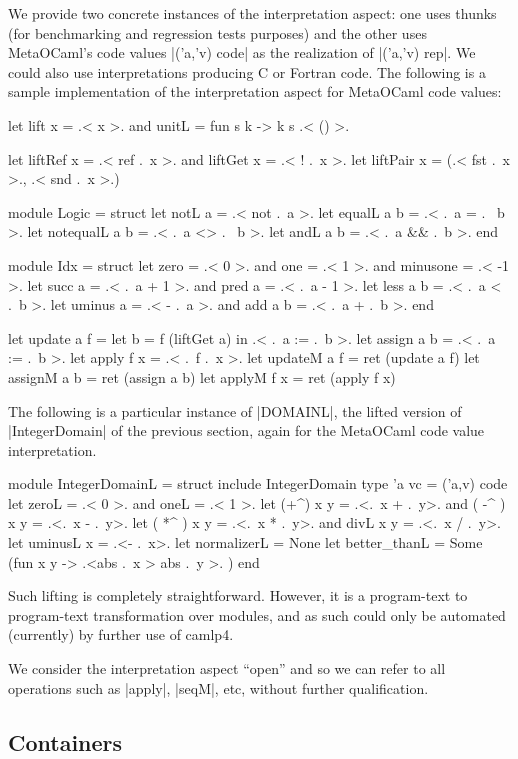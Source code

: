\documentclass{elsart}
\begin{document}
We provide two concrete instances of the interpretation aspect: one
uses thunks (for benchmarking and regression tests purposes) and the
other uses MetaOCaml's code values |('a,'v) code| as the realization
of |('a,'v) rep|. We could also use interpretations producing C or 
Fortran code. The following is a sample implementation of the
interpretation aspect for MetaOCaml code values:
\begin{code}
let lift x = .< x >.   and  unitL = fun s k -> k s .< () >.

let liftRef x = .< ref .~x >.  and   liftGet x = .< ! .~x >. 
let liftPair x = (.< fst .~x >., .< snd .~x >.)

module Logic = struct
  let notL a        = .< not .~a >.
  let equalL a b    = .< .~a = .~ b >.
  let notequalL a b = .< .~a <> .~ b >.
  let andL a b      = .< .~a && .~b >. 
end

module Idx = struct
  let zero = .< 0 >. and one = .< 1 >. and minusone = .< -1 >.
  let succ a = .< .~a + 1 >.  and  pred a = .< .~a - 1 >.
  let less a b = .< .~a < .~b >.
  let uminus a = .< - .~a >.  and  add a b = .< .~a + .~b >.
end

let update  a f = let b = f (liftGet a) in .< .~a := .~b >.
let assign  a b = .< .~a := .~b >.
let apply   f x = .< .~f .~x >.
let updateM a f = ret (update a f)
let assignM a b = ret (assign a b)
let applyM  f x = ret (apply f x)
\end{code}
The following is a particular instance of |DOMAINL|, the lifted
version of |IntegerDomain| of the previous section, again
for the MetaOCaml code value interpretation.
\begin{code}
module IntegerDomainL = struct
    include IntegerDomain
    type 'a vc = ('a,v) code
    let zeroL      = .< 0 >.       and oneL       = .< 1 >. 
    let (+^) x y   = .<.~x + .~y>. and ( -^ ) x y = .<.~x - .~y>.
    let ( *^ ) x y = .<.~x * .~y>. and divL x y   = .<.~x / .~y>. 
    let uminusL x  = .<- .~x>.
    let normalizerL  = None
    let better_thanL = Some (fun x y -> .<abs .~x > abs .~y >. )
end
\end{code}
Such lifting is completely straightforward.  However, it is a
program-text to program-text transformation over modules, and as such could
only be automated (currently) by further use of camlp4.

We consider the interpretation aspect ``open'' and so we can
refer to all operations such as |apply|, |seqM|, etc, without further
qualification.


\subsection{Containers}
\end{document}
